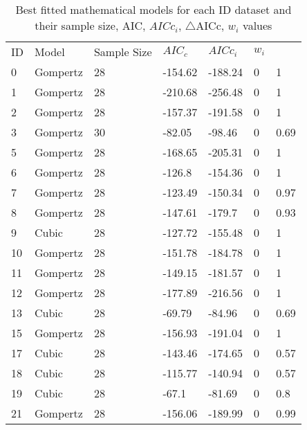\documentclass[11pt]{article}
\begin{document}
    \begin{center}
        \begin{longtable}{lllllll}
        \caption{Best fitted mathematical models for each ID dataset and their sample size, AIC, $AICc_{i}$, $\triangle$AICc, $w_{i}$ values }
        \label{table:4}\\
    
    ID  & Model     & Sample Size &  $AIC_{c}$ & $AICc_{i}$ & $w_{i}$    \\
    0   & Gompertz  & 28              & -154.62 & -188.24 & 0       & 1    \\
    1   & Gompertz  & 28              & -210.68 & -256.48 & 0       & 1    \\
    2   & Gompertz  & 28              & -157.37 & -191.58 & 0       & 1    \\
    3   & Gompertz  & 30              & -82.05  & -98.46  & 0       & 0.69 \\
    5   & Gompertz  & 28              & -168.65 & -205.31 & 0       & 1    \\
    6   & Gompertz  & 28              & -126.8  & -154.36 & 0       & 1    \\
    7   & Gompertz  & 28              & -123.49 & -150.34 & 0       & 0.97 \\
    8   & Gompertz  & 28              & -147.61 & -179.7  & 0       & 0.93 \\
    9   & Cubic     & 28              & -127.72 & -155.48 & 0       & 1    \\
    10  & Gompertz  & 28              & -151.78 & -184.78 & 0       & 1    \\
    11  & Gompertz  & 28              & -149.15 & -181.57 & 0       & 1    \\
    12  & Gompertz  & 28              & -177.89 & -216.56 & 0       & 1    \\
    13  & Cubic     & 28              & -69.79  & -84.96  & 0       & 0.69 \\
    15  & Gompertz  & 28              & -156.93 & -191.04 & 0       & 1    \\
    17  & Cubic     & 28              & -143.46 & -174.65 & 0       & 0.57 \\
    18  & Cubic     & 28              & -115.77 & -140.94 & 0       & 0.57 \\
    19  & Cubic     & 28              & -67.1   & -81.69  & 0       & 0.8  \\
    21  & Gompertz  & 28              & -156.06 & -189.99 & 0       & 0.99 \\

\end{longtable}
\end{center}
\end{document}
